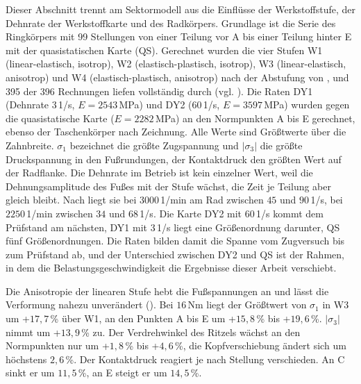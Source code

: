 Dieser Abschnitt trennt am Sektormodell aus  die Einflüsse der Werkstoffstufe, der Dehnrate der Werkstoffkarte und des Radkörpers. Grundlage ist die Serie des Ringkörpers mit 99 Stellungen von einer Teilung vor A bis einer Teilung hinter E mit der quasistatischen Karte (QS). Gerechnet wurden die vier Stufen W1 (linear-elastisch, isotrop), W2 (elastisch-plastisch, isotrop), W3 (linear-elastisch, anisotrop) und W4 (elastisch-plastisch, anisotrop) nach der Abstufung von \cite{Sto18}, und 395 der 396 Rechnungen liefen vollständig durch (vgl. ). Die Raten DY1 (Dehnrate $3$\,1/s, $E = 2543$\,MPa) und DY2 ($60$\,1/s, $E = 3597$\,MPa) wurden gegen die quasistatische Karte ($E = 2282$\,MPa) an den Normpunkten A bis E gerechnet, ebenso der Taschenkörper nach Zeichnung. Alle Werte sind Größtwerte über die Zahnbreite. $\sigma_{\mathrm{1}}$ bezeichnet die größte Zugspannung und $|\sigma_{\mathrm{3}}|$ die größte Druckspannung in den Fußrundungen, der Kontaktdruck den größten Wert auf der Radflanke. Die Dehnrate im Betrieb ist kein einzelner Wert, weil die Dehnungsamplitude des Fußes mit der Stufe wächst, die Zeit je Teilung aber gleich bleibt. Nach  liegt sie bei $3000$\,1/min am Rad zwischen $45$ und $90$\,1/s, bei $2250$\,1/min zwischen $34$ und $68$\,1/s. Die Karte DY2 mit $60$\,1/s kommt dem Prüfstand am nächsten, DY1 mit $3$\,1/s liegt eine Größenordnung darunter, QS fünf Größenordnungen. Die Raten bilden damit die Spanne vom Zugversuch bis zum Prüfstand ab, und der Unterschied zwischen DY2 und QS ist der Rahmen, in dem die Belastungsgeschwindigkeit die Ergebnisse dieser Arbeit verschiebt.

Die Anisotropie der linearen Stufe hebt die Fußspannungen an und lässt die Verformung nahezu unverändert (). Bei $16$\,Nm liegt der Größtwert von $\sigma_{\mathrm{1}}$ in W3 um +$17{,}7$\,\% über W1, an den Punkten A bis E um +$15{,}8$\,\% bis +$19{,}6$\,\%. $|\sigma_{\mathrm{3}}|$ nimmt um +$13{,}9$\,\% zu. Der Verdrehwinkel des Ritzels wächst an den Normpunkten nur um +$1{,}8$\,\% bis +$4{,}6$\,\%, die Kopfverschiebung ändert sich um höchstens $2{,}6$\,\%. Der Kontaktdruck reagiert je nach Stellung verschieden. An C sinkt er um $11{,}5$\,\%, an E steigt er um $14{,}5$\,\%.


